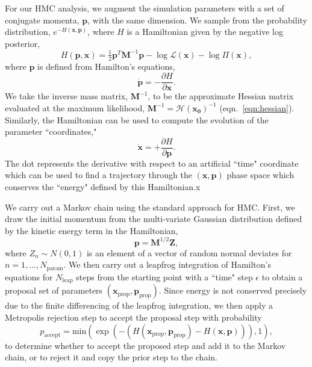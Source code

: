 \documentclass[twocolumn]{aastex63}
\begin{document}

For our HMC analysis, we augment the simulation parameters with a set of conjugate momenta, $\mathbf{p}$, with the same dimension. We sample from the probability distribution, $e^{-H(\mathbf{x},\mathbf{p})}$, where $H$ is a Hamiltonian given by the negative log posterior,
\begin{equation}
    H(\mathbf{p},\mathbf{x}) = \tfrac{1}{2} \mathbf{p}^T \mathbf{M}^{-1} \mathbf{p}
    - \log{\mathcal{L}}(\mathbf{x}) - \log{\Pi(\mathbf{x})},
\end{equation}
where $\mathbf{p}$ is defined from Hamilton's equations,
\begin{equation}
    \dot{\mathbf{p}} = -\frac{\partial H}{\partial \mathbf{x}}.
\end{equation}
We take the inverse mass matrix, $\mathbf{M}^{-1}$, to be the approximate Hessian matrix evaluated at the maximum likelihood, $\mathbf{M}^{-1} = \mathbf{\mathcal{H}(\mathbf{x}_0)}^{-1}$ (eqn.\ \ref{eqn:hessian}).
Similarly, the Hamiltonian can be used to compute the evolution of the parameter ``coordinates,"
\begin{equation}
    \dot{\mathbf{x}} = +\frac{\partial H}{\partial \mathbf{p}}.
\end{equation}
The dot represents the derivative with respect to an artificial ``time" coordinate which can be used to find a trajectory through the $(\mathbf{x},\mathbf{p})$ phase space which conserves the ``energy" defined by this Hamiltonian.x

We carry out a Markov chain using the standard approach for HMC. First, we draw the initial momentum from the multi-variate Gaussian distribution defined by the kinetic energy term in the Hamiltonian,
\begin{equation}
    \mathbf{p} = \mathbf{M}^{1/2} \mathbf{Z},
\end{equation}
where $Z_n \sim N(0,1)$ is an element of a vector of random normal deviates for $n=1,...,N_\mathrm{param}$.
We then carry out a leapfrog integration of Hamilton's equations for $N_\mathrm{leap}$ steps from the starting point with a ``time" step $\epsilon$ to obtain a proposal set of parameters $(\mathbf{x}_\mathrm{prop},\mathbf{p}_\mathrm{prop})$.  Since energy is not conserved precisely due to the finite differencing of the leapfrog integration, we then apply a Metropolis rejection step to accept the proposal step with probability
\begin{equation}
    p_\mathrm{accept} = \mathrm{min}(\exp(-(H(\mathbf{x}_\mathrm{prop},\mathbf{p}_\mathrm{prop}) - H(\mathbf{x},\mathbf{p}))),1),
\end{equation}
to determine whether to accept the proposed step and add it to the Markov chain, or to reject it and copy the prior step to the chain.
\end{document}
